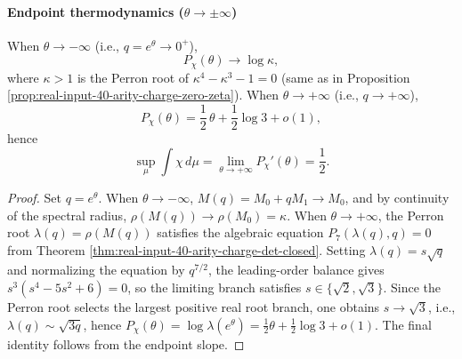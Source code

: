 \paragraph{Endpoint thermodynamics ($\theta\to\pm\infty$)}
\begin{proposition}\label{prop:real-input-40-arity-charge-endpoints}
When $\theta\to-\infty$ (i.e., $q=e^\theta\to 0^+$),
\[
P_\chi(\theta)\to \log\kappa,
\]
where $\kappa>1$ is the Perron root of $\kappa^4-\kappa^3-1=0$ (same as in Proposition \ref{prop:real-input-40-arity-charge-zero-zeta}).
When $\theta\to+\infty$ (i.e., $q\to+\infty$),
\[
P_\chi(\theta)=\frac12\,\theta+\frac12\log 3+o(1),
\]
hence
\[
\sup_\mu\int\chi\,d\mu=\lim_{\theta\to+\infty}P_\chi'(\theta)=\frac12.
\]
\end{proposition}

\begin{proof}
Set $q=e^\theta$. When $\theta\to-\infty$, $M(q)=M_0+qM_1\to M_0$, and by continuity of the spectral radius,
$\rho(M(q))\to\rho(M_0)=\kappa$.
When $\theta\to+\infty$, the Perron root $\lambda(q)=\rho(M(q))$ satisfies the algebraic equation
$P_7(\lambda(q),q)=0$ from Theorem \ref{thm:real-input-40-arity-charge-det-closed}.
Setting $\lambda(q)=s\sqrt q$ and normalizing the equation by $q^{7/2}$, the leading-order balance gives
$s^3(s^4-5s^2+6)=0$, so the limiting branch satisfies $s\in\{\sqrt2,\sqrt3\}$.
Since the Perron root selects the largest positive real root branch, one obtains $s\to\sqrt3$, i.e., $\lambda(q)\sim \sqrt{3q}$,
hence $P_\chi(\theta)=\log\lambda(e^\theta)=\frac12\theta+\frac12\log 3+o(1)$.
The final identity follows from the endpoint slope.
\end{proof}

